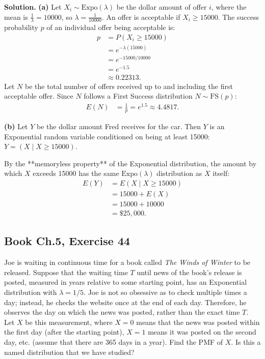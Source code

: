 \documentclass[11pt,a4paper]{article}
\begin{document}
\noindent \textbf{Solution.} \textbf{(a)} Let $X_i \sim \text{Expo}(\lambda)$ be the dollar amount of offer $i$, where the mean is $\frac{1}{\lambda} = 10000$, so $\lambda = \frac{1}{10000}$. An offer is acceptable if $X_i \ge 15000$. The success probability $p$ of an individual offer being acceptable is:
\begin{align*}
p &= P(X_i \ge 15000) \\
&= e^{-\lambda (15000)} \\
&= e^{-15000/10000} \\
&= e^{-1.5} \\
&\approx 0.22313.
\end{align*}
Let $N$ be the total number of offers received up to and including the first acceptable offer. Since $N$ follows a First Success distribution $N \sim \text{FS}(p)$:
\begin{align*}
E(N) &= \frac{1}{p} = e^{1.5} \approx 4.4817.
\end{align*}

\vspace{4pt}
\noindent \textbf{(b)} Let $Y$ be the dollar amount Fred receives for the car. Then $Y$ is an Exponential random variable conditioned on being at least 15000: $Y = (X \mid X \ge 15000)$. 

By the **memoryless property** of the Exponential distribution, the amount by which $X$ exceeds 15000 has the same $\text{Expo}(\lambda)$ distribution as $X$ itself:
\begin{align*}
E(Y) &= E(X \mid X \ge 15000) \\
&= 15000 + E(X) \\
&= 15000 + 10000 \\
&= \$25,000.
\end{align*}

\vspace{10pt}
\subsection{Book Ch.5, Exercise 44}
\begin{tcolorbox}[title={Book Ch.5, Exercise 44}]
Joe is waiting in continuous time for a book called \textit{The Winds of Winter} to be released. Suppose that the waiting time $T$ until news of the book's release is posted, measured in years relative to some starting point, has an Exponential distribution with $\lambda = 1/5$.
Joe is not so obsessive as to check multiple times a day; instead, he checks the website once at the end of each day. Therefore, he observes the day on which the news was posted, rather than the exact time $T$. Let $X$ be this measurement, where $X = 0$ means that the news was posted within the first day (after the starting point), $X = 1$ means it was posted on the second day, etc. (assume that there are 365 days in a year). Find the PMF of $X$. Is this a named distribution that we have studied?
\end{tcolorbox}
\end{document}
